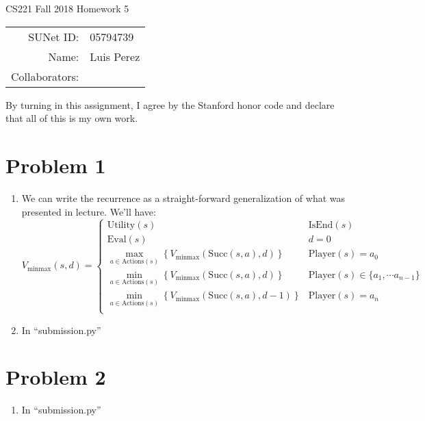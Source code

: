 \documentclass[12pt]{article}
\begin{document}
\begin{center}
{\Large CS221 Fall 2018 Homework 5}

\begin{tabular}{rl}
SUNet ID: & 05794739 \\
Name: & Luis Perez \\
Collaborators: &
\end{tabular}
\end{center}

By turning in this assignment, I agree by the Stanford honor code and declare
that all of this is my own work.

\section*{Problem 1}


\begin{enumerate}[label=(\alph*)]
  \item We can write the recurrence as a straight-forward generalization of what was presented in lecture. We'll have:
  $$
    V_{\text{minmax}}(s,d) =
      \begin{cases}
        \text{Utility}(s) & \text{IsEnd}(s) \\
        \text{Eval}(s) & d = 0 \\
        \max_{a \in \text{Actions}(s)} \left\{ V_{\text{minmax}}(\text{Succ}(s, a), d)\right\} & \text{Player}(s) = a_0 \\
        \min_{a \in \text{Actions}(s)} \left\{ V_{\text{minmax}}(\text{Succ}(s, a), d)\right\} & \text{Player}(s) \in \{ a_1, \cdots a_{n-1}\} \\
        \min_{a \in \text{Actions}(s)} \left\{ V_{\text{minmax}}(\text{Succ}(s, a), d - 1)\right\} & \text{Player}(s) = a_n \\
      \end{cases}
  $$
  \item In ``submission.py''
\end{enumerate}

\section*{Problem 2}
\begin{enumerate}[label=(\alph*)]
  \item In ``submission.py''
\end{enumerate}
\end{document}
